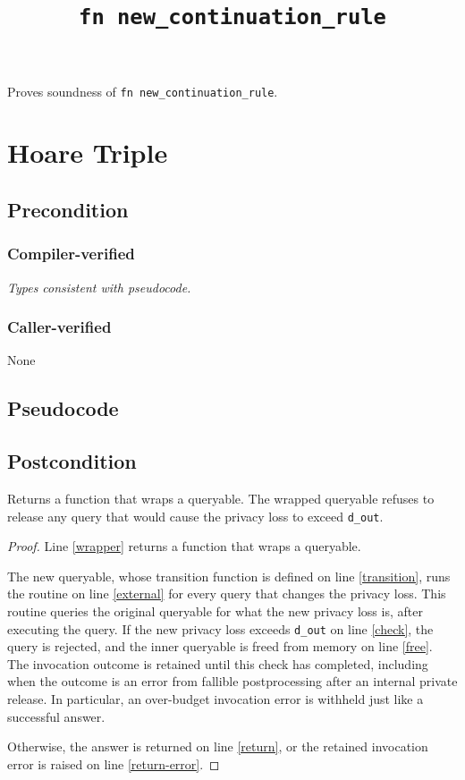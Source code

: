 \documentclass{article}
\title{\texttt{fn new\_continuation\_rule}}
\author{\MichaelShoemateAuthor}
\date{}
\begin{document}
\maketitle

\contrib
Proves soundness of \texttt{fn new\_continuation\_rule}.

\section{Hoare Triple}
\subsection*{Precondition}
\subsubsection*{Compiler-verified}
\textit{Types consistent with pseudocode.}
\subsubsection*{Caller-verified}
None

\subsection*{Pseudocode}


\subsection*{Postcondition}
\begin{theorem}
    Returns a function that wraps a queryable.
    The wrapped queryable refuses to release any query
    that would cause the privacy loss to exceed \texttt{d\_out}.
\end{theorem}

\begin{proof}
    Line \ref{wrapper} returns a function that wraps a queryable.

    The new queryable, whose transition function is defined on line \ref{transition},
    runs the routine on line \ref{external} for every query that changes the privacy loss.
    This routine queries the original queryable for what the new privacy loss is,
    after executing the query.
    If the new privacy loss exceeds \texttt{d\_out} on line \ref{check},
    the query is rejected, and the inner queryable is freed from memory on line \ref{free}.
    The invocation outcome is retained until this check has completed, including when
    the outcome is an error from fallible postprocessing after an internal private release.
    In particular, an over-budget invocation error is withheld just like a successful answer.

    Otherwise, the answer is returned on line \ref{return}, or the retained invocation error
    is raised on line \ref{return-error}.
\end{proof}
\end{document}

